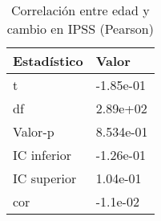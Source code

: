 \begin{table}[ht]
\centering
\caption{Correlación entre edad y cambio en IPSS (Pearson)} 
\label{tab:correlacion_ipss}
\begin{tabular}{ll}
  \hline
Estadístico & Valor \\ 
  \hline
t & -1.85e-01 \\ 
  df & 2.89e+02 \\ 
  Valor-p & 8.534e-01 \\ 
  IC inferior & -1.26e-01 \\ 
  IC superior & 1.04e-01 \\ 
  cor & -1.1e-02 \\ 
   \hline
\end{tabular}
\end{table}
